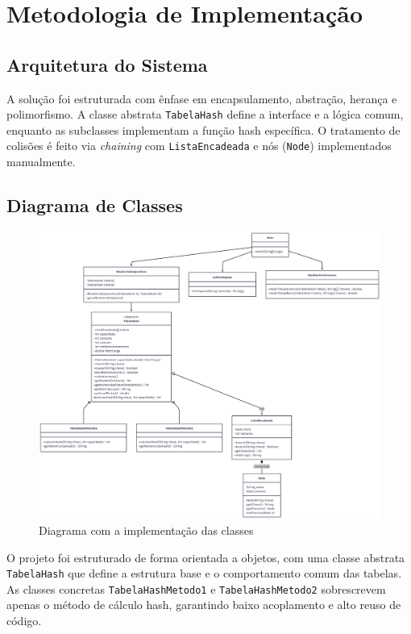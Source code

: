 \documentclass[12pt,a4paper]{abntex2}
\begin{document}
\newpage

\section{Metodologia de Implementação}

\subsection{Arquitetura do Sistema}
A solução foi estruturada com ênfase em encapsulamento, abstração, herança e polimorfismo. A classe abstrata \texttt{TabelaHash} define a interface e a lógica comum, enquanto as subclasses implementam a função hash específica. O tratamento de colisões é feito via \textit{chaining} com \texttt{ListaEncadeada} e nós (\texttt{Node}) implementados manualmente.

\subsection{Diagrama de Classes}

\begin{figure}[h]
    \centering
    \includegraphics[width=1\textwidth]{DiagramClasses.png}
    \caption{Diagrama com a implementação das classes}
    \label{fig:minha_imagem}
\end{figure}

O projeto foi estruturado de forma orientada a objetos, com uma classe abstrata \texttt{TabelaHash} que define a estrutura base e o comportamento comum das tabelas. As classes concretas \texttt{TabelaHashMetodo1} e \texttt{TabelaHashMetodo2} sobrescrevem apenas o método de cálculo hash, garantindo baixo acoplamento e alto reuso de código.
\end{document}
